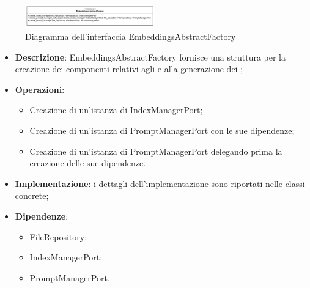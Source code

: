 
 \label{EmbeddingsAbstractFactory}
\begin{figure}[H]
    \centering
    \includegraphics[width=0.5\textwidth]{assets/Backend/embeddings_abstract_factory.png}
    \caption{Diagramma dell'interfaccia EmbeddingsAbstractFactory}
  \end{figure}
\begin{itemize}
    \item \textbf{Descrizione}: EmbeddingsAbstractFactory fornisce una struttura per la creazione dei componenti relativi agli  e alla generazione dei ;
    \item \textbf{Operazioni}:
    \begin{itemize}
      \item Creazione di un'istanza di IndexManagerPort;
      \item Creazione di un'istanza di PromptManagerPort con le sue dipendenze;
      \item Creazione di un'istanza di PromptManagerPort delegando prima la creazione delle sue dipendenze.
    \end{itemize}
    \item \textbf{Implementazione}: i dettagli dell'implementazione sono riportati nelle classi concrete;
    \item \textbf{Dipendenze}:
    \begin{itemize}
        \item FileRepository;
        \item IndexManagerPort;
        \item PromptManagerPort.
    \end{itemize}
\end{itemize}  

